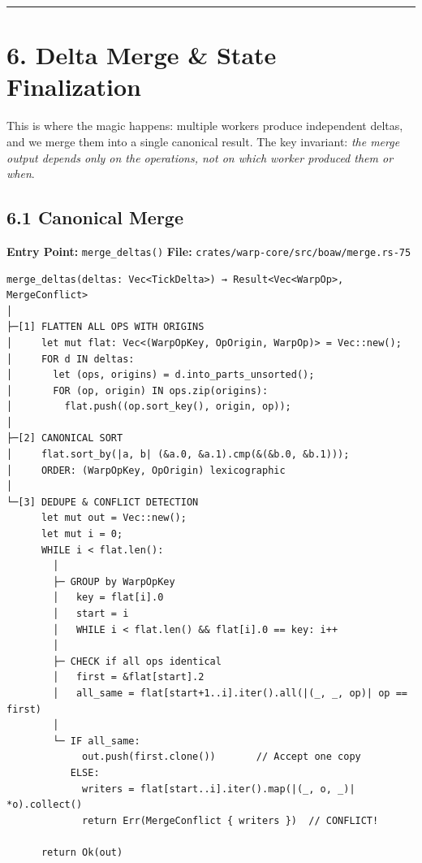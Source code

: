 \documentclass[11pt]{book}
\begin{document}
\begin{center}\rule{0.5\linewidth}{0.5pt}\end{center}

\section{6. Delta Merge \& State
Finalization}\label{delta-merge-state-finalization}

\begin{tourguide}
This is where the magic happens: multiple workers produce independent deltas, and we merge them into a single canonical result. The key invariant: \emph{the merge output depends only on the operations, not on which worker produced them or when}.
\end{tourguide}

\subsection{6.1 Canonical Merge}\label{canonical-merge}

\textbf{Entry Point:} \texttt{merge\_deltas()} \textbf{File:}
\texttt{crates/warp-core/src/boaw/merge.rs-75}

\begin{verbatim}
merge_deltas(deltas: Vec<TickDelta>) → Result<Vec<WarpOp>, MergeConflict>
│
├─[1] FLATTEN ALL OPS WITH ORIGINS
│     let mut flat: Vec<(WarpOpKey, OpOrigin, WarpOp)> = Vec::new();
│     FOR d IN deltas:
│       let (ops, origins) = d.into_parts_unsorted();
│       FOR (op, origin) IN ops.zip(origins):
│         flat.push((op.sort_key(), origin, op));
│
├─[2] CANONICAL SORT
│     flat.sort_by(|a, b| (&a.0, &a.1).cmp(&(&b.0, &b.1)));
│     ORDER: (WarpOpKey, OpOrigin) lexicographic
│
└─[3] DEDUPE & CONFLICT DETECTION
      let mut out = Vec::new();
      let mut i = 0;
      WHILE i < flat.len():
        │
        ├─ GROUP by WarpOpKey
        │   key = flat[i].0
        │   start = i
        │   WHILE i < flat.len() && flat[i].0 == key: i++
        │
        ├─ CHECK if all ops identical
        │   first = &flat[start].2
        │   all_same = flat[start+1..i].iter().all(|(_, _, op)| op == first)
        │
        └─ IF all_same:
             out.push(first.clone())       // Accept one copy
           ELSE:
             writers = flat[start..i].iter().map(|(_, o, _)| *o).collect()
             return Err(MergeConflict { writers })  // CONFLICT!

      return Ok(out)
\end{verbatim}
\end{document}
